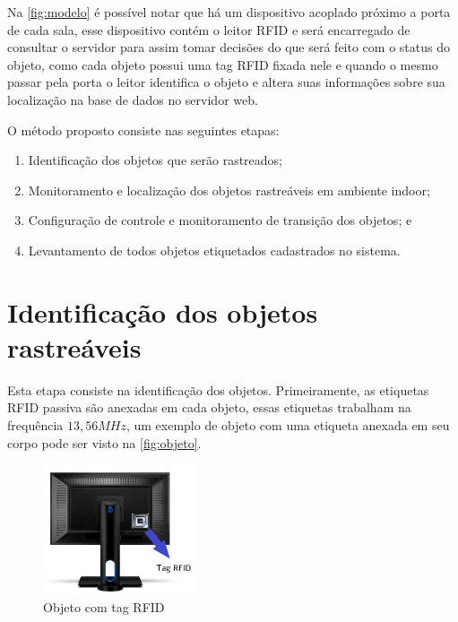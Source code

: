 \par
Na \autoref{fig:modelo} é possível notar que há um dispositivo acoplado próximo a
porta de cada sala, esse dispositivo contém o leitor RFID e será encarregado de consultar o
servidor para assim tomar decisões do que será feito com o status do objeto, como cada objeto possui uma tag RFID fixada
nele e quando o mesmo passar pela porta o leitor identifica o objeto e altera suas informações sobre sua localização na base de dados no servidor web.

\par
O método proposto consiste nas seguintes etapas:
\begin{enumerate}
    \item Identificação dos objetos que serão rastreados;
    \item Monitoramento e localização dos objetos rastreáveis em ambiente indoor; 
    \item Configuração de controle e monitoramento de transição dos objetos; e
    \item Levantamento de todos objetos etiquetados cadastrados no sistema.
\end{enumerate}

%
%
\section{Identificação dos objetos rastreáveis}

Esta etapa consiste na identificação dos objetos. Primeiramente, as etiquetas RFID passiva são anexadas em cada objeto, essas etiquetas trabalham na frequência $13,56MHz$, um exemplo de objeto com uma etiqueta anexada em seu corpo pode ser visto na \autoref{fig:objeto}.
\begin{figure}[H]
              \caption{\label{fig:objeto}{Objeto com tag RFID}}
              \centering
              \includegraphics[width=0.4\textwidth]{Figuras/monitor.png}
\end{figure}

